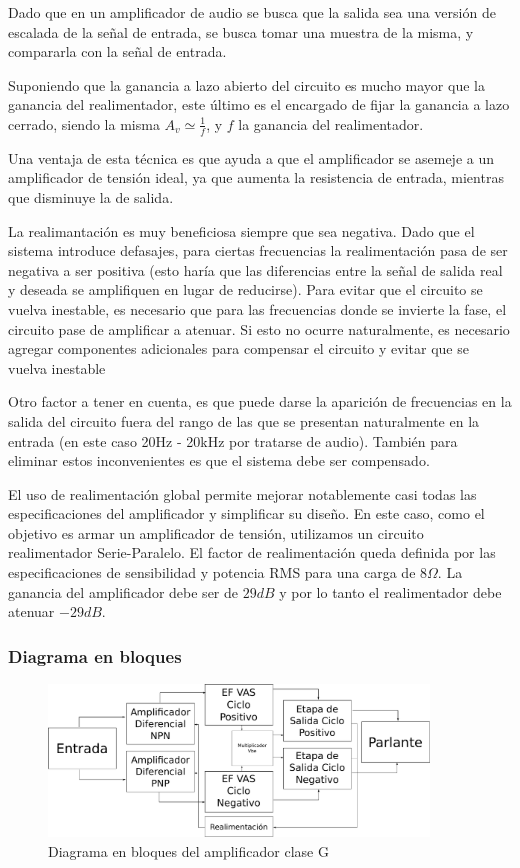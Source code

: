 \documentclass[a4paper,12pt,twoside]{article}
\begin{document}
Dado que en un amplificador de audio se busca que la salida sea una versión de escalada de la señal de entrada, se busca tomar una muestra de la misma, y compararla con la señal de entrada. 

Suponiendo que la ganancia a lazo abierto del circuito es mucho mayor que la ganancia del realimentador, este último es el encargado de fijar la ganancia a lazo cerrado, siendo la misma $A_v \simeq \frac{1}{f}$, y $f$ la ganancia del realimentador.

Una ventaja de esta técnica es que ayuda a que el amplificador se asemeje a un amplificador de tensión ideal, ya que aumenta la resistencia de entrada, mientras que disminuye la de salida. 

La realimantación es muy beneficiosa siempre que sea negativa. Dado que el sistema introduce defasajes, para ciertas frecuencias la realimentación pasa de ser negativa a ser positiva (esto haría que las diferencias entre la señal de salida real y deseada se amplifiquen en lugar de reducirse). Para evitar que el circuito se vuelva inestable, es necesario que para las frecuencias donde se invierte la fase, el circuito pase de amplificar a atenuar. Si esto no ocurre naturalmente, es necesario agregar componentes adicionales para compensar el circuito y evitar que se vuelva inestable

Otro factor a tener en cuenta, es que puede darse la aparición de frecuencias en la salida del circuito fuera del rango de las que se presentan naturalmente en la entrada (en este caso 20Hz - 20kHz por tratarse de audio). También para eliminar estos inconvenientes es que el sistema debe ser compensado.

El uso de realimentación global permite mejorar notablemente casi todas las especificaciones del amplificador y simplificar su diseño. En este caso, como el objetivo es armar un amplificador de tensión, utilizamos un circuito realimentador Serie-Paralelo. El factor de realimentación queda definida por las especificaciones de sensibilidad y potencia RMS para una carga de $8\Omega$. La ganancia del amplificador debe ser de $29dB$ y por lo tanto el realimentador debe atenuar $-29dB$.



\subsubsection{Diagrama en bloques}



\begin{figure}[H]
	\centering
	\includegraphics[width=0.9\textwidth]{img/bloques}
	\caption{Diagrama en bloques del amplificador clase G}
	\label{fig:ampli_bloques}
\end{figure}
\end{document}
